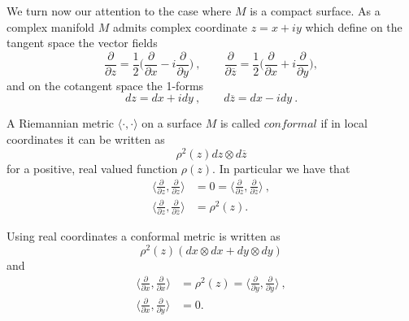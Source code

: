 We turn now our attention to the case where $M$ is a compact surface. As a complex manifold $M$ admits complex coordinate $z=x + iy$ which define on the tangent space the vector fields
\[
\frac{\partial}{\partial z} = \frac{1}{2} \Big(\frac{\partial}{\partial x} -i \frac{\partial}{\partial y} \Big) \ , \qquad \frac{\partial}{\partial \overline{z}} = \frac{1}{2} \Big(\frac{\partial}{\partial x} + i \frac{\partial}{\partial y} \Big) ,
\]
and on the cotangent space the 1-forms
\[
dz = dx + idy \ , \qquad d\overline{z} = dx - idy \ .
\]
\begin{definition}
    A Riemannian metric $\langle \cdot , \cdot \rangle$ on a surface $M$ is called $\textit{conformal}$ if in local coordinates it can be written as
    \[
        \rho^2(z) dz \otimes d\overline{z}
    \]
    for a positive, real valued function $\rho(z)$. In particular we have that
    \[
    \begin{split}
        \Big\langle \frac{\partial}{\partial z}, \frac{\partial}{\partial z} \Big\rangle & = 0 = \Big\langle \frac{\partial}{\partial \overline{z}}, \frac{\partial}{\partial \overline{z}} \Big\rangle \ , \\
         \Big\langle \frac{\partial}{\partial z}, \frac{\partial}{\partial \overline{z}} \Big\rangle & = \rho^2(z).
    \end{split}
    \]
\end{definition}
\begin{observation}
    Using real coordinates a conformal metric is written as 
    \[
        \rho^2(z) (dx \otimes dx + dy \otimes dy)
    \]
    and
    \[
    \begin{split}
        \Big\langle \frac{\partial}{\partial x}, \frac{\partial}{\partial x} \Big\rangle & = \rho^2(z) = \Big\langle \frac{\partial}{\partial y}, \frac{\partial}{\partial y} \Big\rangle \ , \\
         \Big\langle \frac{\partial}{\partial x}, \frac{\partial}{\partial y} \Big\rangle & = 0.
    \end{split}
    \]
\end{observation}

